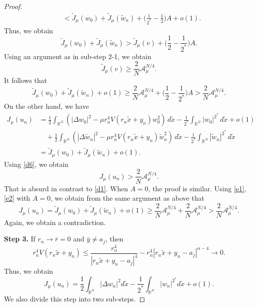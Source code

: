 \documentclass[reqno]{amsart}
\begin{document}
\begin{proof}
\begin{align*}
 &<\tilde{J}_\mu(w_0)+\tilde{J}_\mu( \tilde{w}_n)
  +\Big( \frac{1}{2^*}-\frac{1}{2}\Big) A+o(1).
 \end{align*}
Thus, we obtain
\[
 \tilde{J}_\mu(w_0)+\tilde{J}_\mu( \tilde{w}_n)>\tilde{J}_\mu(v)
 + \Big( \frac{1}{2}-\frac{1}{2^*}\Big) A.
 \]
Using an argument as in sub-step 2-1, we obtain
\[
 \tilde{J}_\mu(v)\geq \frac{2}{N}\mathcal{A}_{\mu}^{N/4}.
\]
It follows that
\begin{equation}\label{d6}
 \tilde{J}_\mu(w_0)+\tilde{J}_\mu( \tilde{w}_n)+o(1)
 \geq \frac{2}{N}\mathcal{A}_{\mu}^{N/4}
 + \Big( \frac{1}{2}-\frac{1}{2^*}\Big) A> \frac{2}{N}\mathcal{A}_{\mu}^{N/4}.
\end{equation}
On the other hand, we have
 \begin{align*}
 J_\mu(u_n)
 &=\frac{1}{2}\int_{\mathbb{R}^N}\left(|\Delta w_0|^2-\mu r_n^4V(r_n\tilde{x}+y_n)w_0^2\right)\,d\tilde{x}-\frac{1}{2^*}\int _{\mathbb{R}^N}|w_0|^{2^*}\,d\tilde{x}+o(1)\\
 &\quad +\frac{1}{2}\int_{\mathbb{R}^N}\left(|\Delta \tilde{w}_n|^2-\mu r_n^4V(r_n\tilde{x}+y_n) \tilde{w}_n^2\right)\,d\tilde{x}-\frac{1}{2^*}\int _{\mathbb{R}^N}| \tilde{w}_n|^{2^*}\,d\tilde{x}\\
 &=\tilde{J}_\mu(w_0)+\tilde{J}_\mu( \tilde{w}_n)+o(1).
 \end{align*}
 Using \eqref{d6}, we obtain
 \[
 J_\mu(u_n)> \frac{2}{N}\mathcal{A}_{\mu}^{N/4}.
 \]
 That is absurd in contrast to \eqref{d1}. When $A=0$, the proof is similar. 
 Using \eqref{e1}, \eqref{e2} with $A=0$, we obtain from the same argument as 
 above that
 \[
 J_\mu(u_n)=\tilde{J}_\mu(w_0)+\tilde{J}_\mu( \tilde{w}_n)+o(1)\geq \frac{2}{N}\mathcal{A}_{\mu}^{N/4}+\frac{2}{N}\mathcal{A}_{\mu}^{N/4}>\frac{2}{N}\mathcal{A}_{\mu}^{N/4}.
 \]
Again, we obtain a contradiction. 
\smallskip

\noindent\textbf{Step 3.} If \(r_n\to \bar{r}=0\) and \(\bar {y}\neq a_j\), then
\[
 r_n^4V(r_n\tilde{x}+y_n)\leq \frac{r_n^4}{\left|r_n\tilde{x}
 +y_n-a_j\right| ^4 }-r_n^4\left|r_n\tilde{x}+y_n-a_j\right|^{\alpha-4}\to 0.
 \]
Thus, we obtain
\begin{equation}\label{b1}
 J_\mu(u_n)=\frac{1}{2}\int_{\mathbb{R}^N}|\Delta {w}_n|^2d\tilde{x}
 -\frac{1}{2^*}\int _{\mathbb{R}^N}|{w}_n|^{2^*}d\tilde{x}+o(1).
\end{equation}
We also divide this step into two sub-steps.
\smallskip


\end{proof}
\end{document}
